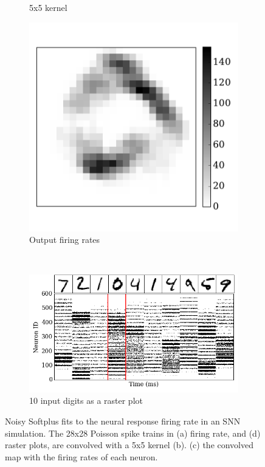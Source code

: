 \begin{figure}[tbh!]
\begin{subfigure}[t]{0.3\textwidth}
			\caption{5x5 kernel}
			\label{Fig:63}
		\end{subfigure}
		\begin{subfigure}[t]{0.3\textwidth}
			\includegraphics[width=\textwidth]{pics_iconip/6-4.pdf}
			\caption{Output firing rates}
			\label{Fig:64}
		\end{subfigure}
		\\
		\begin{subfigure}[t]{0.8\textwidth}
			\includegraphics[width=\textwidth]{pics_iconip/6-1.png}
			\caption{10 input digits as a raster plot}
			\label{Fig:61}
		\end{subfigure}
		\caption{
			Noisy Softplus fits to the neural response firing rate in an SNN simulation.
			The 28x28 Poisson spike trains in (a) firing rate, and (d) raster plots, are convolved with a 5x5 kernel (b).
			(c) the convolved map with the firing rates of each neuron.}
		\label{fig:cnn}
	\end{figure}
	
